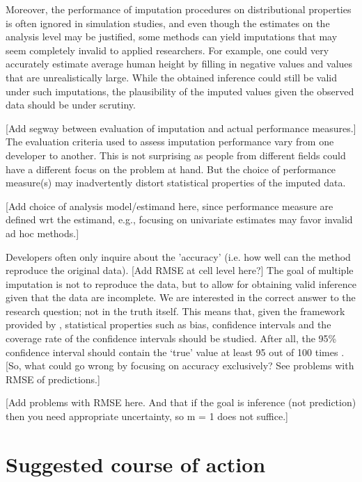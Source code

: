 \documentclass[bimj,fleqn]{w-art}
\theoremstyle{plain}
\theoremstyle{definition}
\begin{document}
Moreover, the performance of imputation procedures on distributional properties is often ignored in simulation studies, and even though the estimates on the analysis level may be justified, some methods can yield imputations that may seem completely invalid to applied researchers. For example, one could very accurately estimate average human height by filling in negative values and values that are unrealistically large. While the obtained inference could still be valid under such imputations, the plausibility of the imputed values given the observed data should be under scrutiny. 

[Add segway between evaluation of imputation and actual performance measures.]
The evaluation criteria used to assess imputation performance vary from one developer to another. This is not surprising as people from different fields could have a different focus on the problem at hand. But the choice of performance measure(s) may inadvertently distort statistical properties of the imputed data.

[Add choice of analysis model/estimand here, since performance measure are defined wrt the estimand, e.g., focusing on univariate estimates may favor invalid ad hoc methods.]

Developers often only inquire about the 'accuracy' (i.e. how well can the method reproduce the original data). [Add RMSE at cell level here?] The goal of multiple imputation is not to reproduce the data, but to allow for obtaining valid inference given that the data are incomplete. We are interested in the correct answer to the research question; not in the truth itself. This means that, given the framework provided by \citet{rubi87}, statistical properties such as bias, confidence intervals and the coverage rate of the confidence intervals should be studied. After all, the 95\% confidence interval should contain the `true' value at least 95 out of 100 times \citep[][p. 591]{neym34}. [So, what could go wrong by focusing on accuracy exclusively? See problems with RMSE of predictions.]

[Add problems with RMSE here. And that if the goal is inference (not prediction) then you need appropriate uncertainty, so m = 1 does not suffice.]



\section{Suggested course of action}
\end{document}
